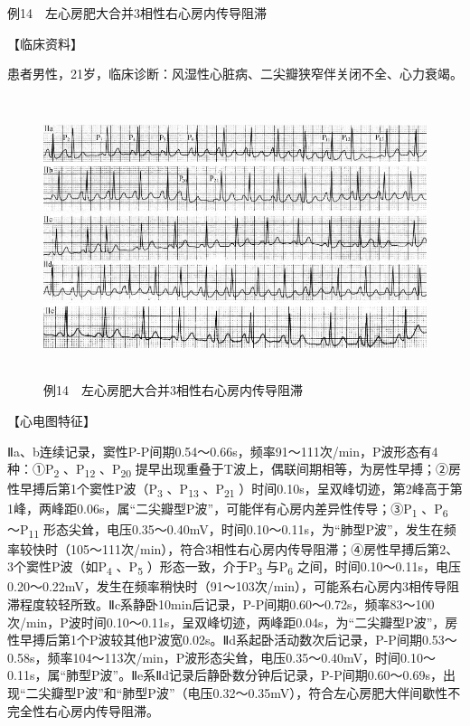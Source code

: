 例14　左心房肥大合并3相性右心房内传导阻滞

【临床资料】

患者男性，21岁，临床诊断：风湿性心脏病、二尖瓣狭窄伴关闭不全、心力衰竭。

\begin{figure}[!htbp]
 \centering
 \includegraphics[width=5.58333in,height=3.25in]{./images/Image00772.jpg}
 \captionsetup{justification=centering}
 \caption{例14　左心房肥大合并3相性右心房内传导阻滞}
 \label{fig50-14}
  \end{figure} 

【心电图特征】

Ⅱa、b连续记录，窦性P-P间期0.54～0.66s，频率91～111次/min，P波形态有4种：①P\textsubscript{2}
、P\textsubscript{12} 、P\textsubscript{20}
提早出现重叠于T波上，偶联间期相等，为房性早搏；②房性早搏后第1个窦性P波（P\textsubscript{3}
、P\textsubscript{13} 、P\textsubscript{21}
）时间0.10s，呈双峰切迹，第2峰高于第1峰，两峰距0.06s，属“二尖瓣型P波”，可能伴有心房内差异性传导；③P\textsubscript{1}
、P\textsubscript{6} ～P\textsubscript{11}
形态尖耸，电压0.35～0.40mV，时间0.10～0.11s，为“肺型P波”，发生在频率较快时（105～111次/min），符合3相性右心房内传导阻滞；④房性早搏后第2、3个窦性P波（如P\textsubscript{4}
、P\textsubscript{5} ）形态一致，介于P\textsubscript{3}
与P\textsubscript{6}
之间，时间0.10～0.11s，电压0.20～0.22mV，发生在频率稍快时（91～103次/min），可能系右心房内3相传导阻滞程度较轻所致。Ⅱc系静卧10min后记录，P-P间期0.60～0.72s，频率83～100次/min，P波时间0.10～0.11s，呈双峰切迹，两峰距0.04s，为“二尖瓣型P波”，房性早搏后第1个P波较其他P波宽0.02s。Ⅱd系起卧活动数次后记录，P-P间期0.53～0.58s，频率104～113次/min，P波形态尖耸，电压0.35～0.40mV，时间0.10～0.11s，属“肺型P波”。Ⅱe系Ⅱd记录后静卧数分钟后记录，P-P间期0.60～0.69s，出现“二尖瓣型P波”和“肺型P波”（电压0.32～0.35mV），符合左心房肥大伴间歇性不完全性右心房内传导阻滞。

